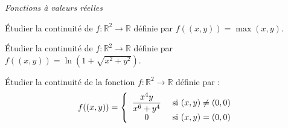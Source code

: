 \documentclass[a4paper,10pt]{report}
\begin{document}
\begin{center}
\textit{{ {\large Fonctions à valeurs réelles}}}
\end{center}

\medskip



\begin{Exercice}{} Étudier la continuité de $f : \mathbb{R}^2 \rightarrow \mathbb{R}$ définie par $ f((x,y))=  \max(x,y)$.
\end{Exercice}


\begin{Exercice}{} Étudier la continuité de $f : \mathbb{R}^2 \rightarrow \mathbb{R}$ définie par $f((x,y))= \ln(1 + \sqrt{x^2+y^2})$.
\end{Exercice}


\begin{Exercice}{} Étudier la continuité de la fonction $f : \mathbb{R}^2 \rightarrow \mathbb{R}$ définie par :
$$ f((x,y)) = \left\lbrace \begin{array}{cl}
\dfrac{x^4 y}{x^6+y^4} & \hbox{ si } (x,y) \neq (0,0) \\
0 & \hbox{ si } (x,y)=(0,0) \\
\end{array}\right.$$
\end{Exercice}

%
%
\end{document}
